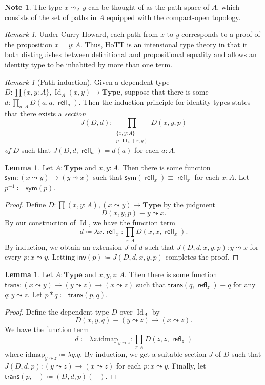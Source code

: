 \documentclass[10pt,letterpaper,cm]{nupset}
\theoremstyle{definition}
\newtheorem{note}[definition]{Note}
\theoremstyle{theorem}
\newtheorem{lemma}[definition]{Lemma}
\theoremstyle{remark}
\newtheorem{remark}[definition]{Remark}
\newcommand{\1}{\mathbf{1}}
\newcommand{\0}{\vec 0}
\DeclareMathOperator{\id}{Id}
\DeclareMathOperator{\refl}{\mathsf{refl}}
\begin{document}
\begin{note}
The type $x \leadsto_A y$ can be thought of as the path space of $A$, which consists of the set of paths in $A$ equipped with the compact-open topology. 
\end{note}

\begin{remark} 
Under Curry-Howard, each path from $x$ to $y$ corresponds to a proof of the proposition  $x=y : A$.  Thus, HoTT is an intensional type theory in that it both distinguishes between definitional and propositional equality and allows an identity type to be inhabited by more than one term.
\end{remark}

\begin{remark}[Path induction]
Given a dependent type $D: \prod {\{x,y:A\}}, \id_A(x,y) \to \mathbf{Type}$, suppose that there is some $d: \prod_{a:A} D(a,a, \refl_a)$. Then the induction principle for identity types states that there exists a \textit{section}  $$J(D, d)  :  \prod_{\substack{\{x,y:A\} \\ p: \id_A(x,y)}} D(x,y,p) $$  \textit{of $D$} such that $J(D, d, \refl_a) = d(a)$ for each $a: A$.
\end{remark}

\begin{lemma}
Let $A: \mathbf{Type}$ and $x,y: A$. Then there is some function $\mathsf{sym}:(x\leadsto y) \to (y \leadsto x)$ such that $\mathsf{sym} (\refl_x) \equiv \refl_x$ for each $x:A$. Let $p^{{-}1} \coloneqq \mathsf{sym}(p)$.
\end{lemma}
\begin{proof}
Define $D: \prod (x,y:A), (x\leadsto y) \to \mathbf{Type}$ by the judgment $$D(x,y,p) \equiv y \leadsto x .$$ By our construction of $\id$, we have the function term $$d\coloneqq \lambda x. \refl_x : \prod_{x:A}D(x,x,\refl_x).$$ By induction, we obtain an extension $J$ of $d$ such that $J(D, d, x, y, p) : y \leadsto x$ for every $p: x \leadsto y$. Letting $\mathsf{inv}(p) \coloneqq J(D, d,x,y,p)$ completes the proof.
\end{proof}

\begin{lemma}
Let $A: \mathbf{Type}$ and $x,y,z: A$. Then there is some function $\mathsf{trans} : (x\leadsto y) \to (y \leadsto z) \to (x \leadsto z)$ such that $\mathsf{trans}(q, \refl_z) \equiv q$ for any $q: y \leadsto z$. Let $p \ast q \coloneqq \mathsf{trans}(p,q)$.
\end{lemma}
\begin{proof}
Define the dependent type $D$ over $\id_A$ by $$D(x, y, q) \equiv (y \leadsto z) \to (x \leadsto z).$$ We have the function term $$d \coloneqq\lambda z.\text{idmap}_{y\leadsto z} : \prod_{z: A} D(z, z, \refl_z)$$ where $\text{idmap}_{y\leadsto z} \coloneqq \lambda q.q$. By induction, we get a suitable section $J$ of $D$ such that $J(D, d, p) : (y \leadsto z) \to (x\leadsto z)$ for each $p: x\leadsto y$.  Finally, let $\mathsf{trans}(p, -) \coloneqq (D, d, p)(-)$.
\end{proof}
\end{document}
